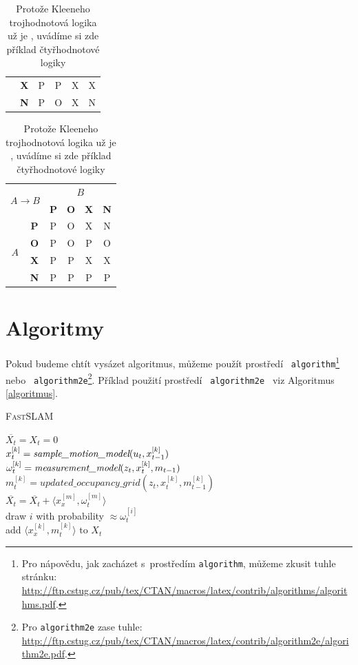 \documentclass[a4paper,11pt]{article}
\begin{document}
\begin{table}[h]
\begin{tabular}[p]{|c|c|c|c|c|c|}
\cline{2-6}
                       & \textbf{X} & P & P & X & X \\ 
\cline{2-6}
					   & \textbf{N} & P & O & X & N \\ 
\hline
\end{tabular}
\begin{tabular}[p]{|c|c|c|c|c|c|}
\hline
\multicolumn{2}{|c|}{\multirow{2}{*}{$A \rightarrow B$}} & \multicolumn{4}{c|}{$B$}
\\ \cline{3-6}
\multicolumn{2}{|c|}{} & \textbf{P} & \textbf{O} & \textbf{X}	& \textbf{N} \\ \hline
\multirow{4}{*}{$ A $} & \textbf{P} & P & O & X & N \\
\cline{2-6}
					   & \textbf{O} & P & O & P & O \\
\cline{2-6}
					   & \textbf{X} & P & P & X & X \\ 
\cline{2-6}
					   & \textbf{N} & P & P & P & P \\ 
\hline
\end{tabular}
\caption{Protože Kleeneho trojhodnotová logika už je , uvádíme si zde příklad čtyřhodnotové logiky}
\label{tabulka2}
\end{table}

\pagebreak

\section{Algoritmy}
\label{algoritmy}
Pokud budeme chtít vysázet algoritmus, můžeme použít prostředí \texttt{ algorithm}\footnote{Pro nápovědu, jak zacházet s~prostředím \texttt{algorithm}, můžeme zkusit tuhle stránku:
\url{http://ftp.cstug.cz/pub/tex/CTAN/macros/latex/contrib/algorithms/algorithms.pdf}.}  nebo \texttt{ algorithm2e}\footnote{Pro \texttt{algorithm2e} zase tuhle:
\url{http://ftp.cstug.cz/pub/tex/CTAN/macros/latex/contrib/algorithm2e/algorithm2e.pdf}.}.
Příklad použití prostředí \texttt{ algorithm2e } viz Algoritmus \ref{algoritmus}.

\IncMargin{1.5em}
\begin{algorithm}
\caption{\textsc{FastSLAM}}
\label{algoritmus}

\SetNlSty{}{}{:}
\SetNlSkip{0.4em}
\SetInd{1em}{1em}


\Indm
{}
\Indp
\BlankLine
$\overline{X_t} = X_t = 0 $ \\
{$x_t^{[k]} = \emph{sample\_motion\_model}(u_t, x_{t-1}^{[k]})$ \\
$\omega_t^{[k]} = \emph{measurement\_model}(z_t, x_t^{[k]}, m_{t-1})$ \\
$m_t^{[k]} = updated\_occupancy\_grid(z_t, x_t^{[k]}, m_{t-1}^{[k]})$ \\
$\overline{X_t} = \overline{X_t} + \langle x_x^{[m]}, \omega_t^{[m]}  \rangle$ \\}
{draw $i$ with probability $\approx \omega_t^{[i]}$ \\
add $ \langle x_x^{[k]}, m_t^{[k]} \rangle \textrm{ to } X_t$ }
	\end{algorithm}
	\DecMargin{1.5em}
\end{document}
